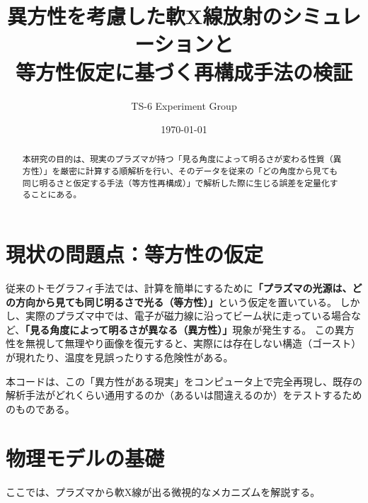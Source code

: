 \documentclass[a4paper,11pt]{bxjsarticle} %
\title{異方性を考慮した軟X線放射のシミュレーションと\\等方性仮定に基づく再構成手法の検証}
\author{TS-6 Experiment Group}
\date{\today}
\begin{document}
\maketitle

\begin{abstract}
本研究の目的は、現実のプラズマが持つ「見る角度によって明るさが変わる性質（異方性）」を厳密に計算する順解析を行い、そのデータを従来の「どの角度から見ても同じ明るさと仮定する手法（等方性再構成）」で解析した際に生じる誤差を定量化することにある。
\end{abstract}

\section{現状の問題点：等方性の仮定}
従来のトモグラフィ手法では、計算を簡単にするために\textbf{「プラズマの光源は、どの方向から見ても同じ明るさで光る（等方性）」}という仮定を置いている。
しかし、実際のプラズマ中では、電子が磁力線に沿ってビーム状に走っている場合など、\textbf{「見る角度によって明るさが異なる（異方性）」}現象が発生する。
この異方性を無視して無理やり画像を復元すると、実際には存在しない構造（ゴースト）が現れたり、温度を見誤ったりする危険性がある。

本コードは、この「異方性がある現実」をコンピュータ上で完全再現し、既存の解析手法がどれくらい通用するのか（あるいは間違えるのか）をテストするためのものである。

\section{物理モデルの基礎}

ここでは、プラズマから軟X線が出る微視的なメカニズムを解説する。


\end{document}
